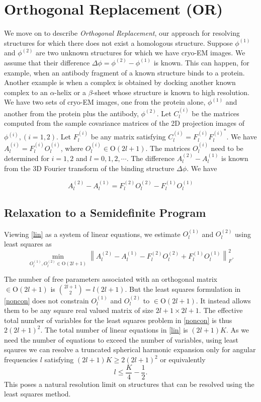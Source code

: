 \section{Orthogonal Replacement (OR)}
We move on to describe {\em Orthogonal Replacement}, our approach for resolving structures for which there does not exist a homologous structure.  Suppose $\phi^{(1)}$ and $\phi^{(2)}$
are two unknown structures
for which we have cryo-EM images.
We assume that their difference $\Delta \phi =\phi^{(2)} -\phi^{(1)}$ is known.
This can happen, for example, when
an antibody fragment of a known structure binds to a protein. Another example is when a complex is obtained by docking another known complex to an $\alpha$-helix or a $\beta$-sheet whose structure is known to high resolution. We have two sets
of cryo-EM images, one from the protein alone, $\phi^{(1)}$
and another from the protein plus the antibody, $\phi^{(2)}$. Let $C_l^{(i)}$ be the matrices computed from the sample covariance
matrices of the 2D projection images of $\phi^{(i)}, (i=1,2)$.
Let $F_l^{(i)}$ be any matrix satisfying $C_l^{(i)} = F_l^{(i)}{F_l^{(i)}}^{*}$. We have
$A_l^{(i)} = F_l^{(i)} O_l^{(i)}$, where $O_l^{(i)} \in \text{O}(2l+1)$.
The matrices $O_l^{(i)}$ need to be determined for $i=1,2$ and $l=0,1,2, \cdots$. The
difference $A_l^{(2)} -A_l^{(1)}$ is known from
the 3D Fourier transform of the binding structure $\Delta \phi$. We have

\begin{equation}\label{lin}
A_l^{(2)}-A_l^{(1)}=F_l^{(2)}O_l^{(2)}-F_l^{(1)}O_l^{(1)}
\end{equation}

\subsection{Relaxation to a Semidefinite Program}
Viewing \eqref{lin} as a system of linear equations, we estimate $O_l^{(1)}$ and $O_l^{(2)}$  using least squares as
\begin{equation}\label{noncon}
\min_{O_l^{(1)},O_l^{(2)} \in \text{O}(2l+1)}
\left\|A_l^{(2)}-A_l^{(1)}-F_l^{(2)}O_l^{(2)}+F_l^{(1)}O_l^{(1)} \right\|_F^2.
\end{equation}

The number of free parameters associated with an orthogonal matrix $\in \text{O}(2l+1)$ is $\binom{2l+1}{2}=l(2l+1)$. But the least squares formulation in \eqref{noncon} does not constrain $O_l^{(1)}$ and $O_l^{(2)}$ to $\in \text{O}(2l+1)$. It instead allows them to be any square real valued matrix of size $2l+1 \times 2l+1$. The effective total number of variables for the least squares problem in \eqref{noncon} is thus $2(2l+1)^2$. The total number of linear equations in \eqref{lin} is $(2l+1)K$. As we need the number of equations to exceed the number of variables, using least sqaures we can resolve a truncated spherical harmonic expansion only for angular frequencies $l$ satisfying $(2l+1)K \geq 2(2l+1)^2$ or equivalently 
\begin{equation}\label{res_ls}
l \leq \frac{K}{4} - \frac{1}{2}.
\end{equation}
This poses a natural resolution limit on structures that can be resolved using the least squares method.

